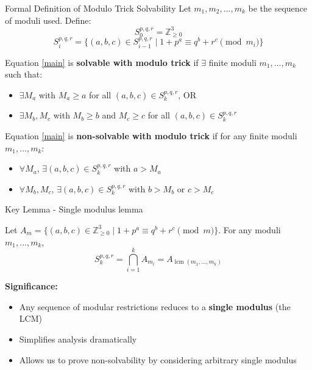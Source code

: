 \begin{frame}{Formal Definition of Modulo Trick Solvability}
    Let $m_1,m_2,...,m_k$ be the sequence of moduli used. Define:
    \[S_0^{p,q,r} = \mathbb{Z}_{\geq 0}^3\]
    \[S_i^{p,q,r} = \{(a,b,c)\in S_{i-1}^{p,q,r} \; | \; 1+p^a \equiv q^b+r^c \pmod{m_i}\}\]
    
    \begin{Definitionn}
        Equation \eqref{main} is \textbf{solvable with modulo trick} if $\exists$ finite moduli $m_1,...,m_k$ such that:
        \begin{itemize}
            \item $\exists M_a$ with $M_a \geq a$ for all $(a,b,c) \in S_k^{p,q,r}$, OR
            \item $\exists M_b,M_c$ with $M_b \geq b$ and $M_c \geq c$ for all $(a,b,c) \in S_k^{p,q,r}$
        \end{itemize}
    \end{Definitionn}
    
    \begin{Definitionn}
        Equation \eqref{main} is \textbf{non-solvable with modulo trick} if for any finite moduli $m_1,...,m_k$:
        \begin{itemize}
            \item $\forall M_a$, $\exists (a,b,c) \in S_k^{p,q,r}$ with $a > M_a$
            \item $\forall M_b,M_c$, $\exists (a,b,c) \in S_k^{p,q,r}$ with $b > M_b$ or $c > M_c$
        \end{itemize}
    \end{Definitionn}
\end{frame}
\begin{frame}{Key Lemma - Single modulus lemma}
    \begin{lemmas}
        Let $A_m = \{(a,b,c) \in \mathbb{Z}_{\geq 0}^3 \; | \; 1+p^a \equiv q^b+r^c \pmod{m}\}$.
        For any moduli $m_1,...,m_k$,
        \[S_k^{p,q,r} = \bigcap_{i=1}^k A_{m_i} = A_{\operatorname{lcm}(m_1,...,m_k)}\]
    \end{lemmas}
    
    \textbf{Significance:}
    \begin{itemize}
        \item Any sequence of modular restrictions reduces to a \textbf{single modulus} (the LCM)
        \item Simplifies analysis dramatically
        \item Allows us to prove non-solvability by considering arbitrary single modulus
    \end{itemize}
\end{frame}

